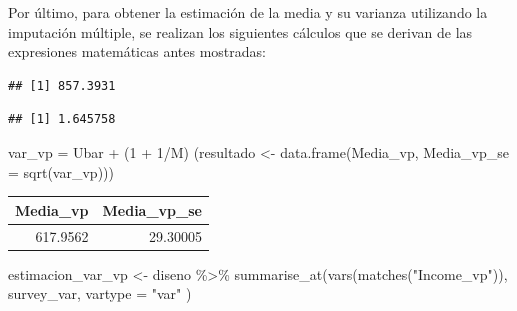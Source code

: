 \documentclass[
  12pt,
]{book}
\newenvironment{Shaded}{\begin{snugshade}}{\end{snugshade}}
\newcommand{\AttributeTok}[1]{\textcolor[rgb]{0.77,0.63,0.00}{#1}}
\newcommand{\DecValTok}[1]{\textcolor[rgb]{0.00,0.00,0.81}{#1}}
\newcommand{\FunctionTok}[1]{\textcolor[rgb]{0.00,0.00,0.00}{#1}}
\newcommand{\NormalTok}[1]{#1}
\newcommand{\OtherTok}[1]{\textcolor[rgb]{0.56,0.35,0.01}{#1}}
\newcommand{\SpecialCharTok}[1]{\textcolor[rgb]{0.00,0.00,0.00}{#1}}
\newcommand{\StringTok}[1]{\textcolor[rgb]{0.31,0.60,0.02}{#1}}
\begin{document}
Por último, para obtener la estimación de la media y su varianza utilizando la imputación múltiple, se realizan los siguientes cálculos que se derivan de las expresiones matemáticas antes mostradas:

\begin{Shaded}
\end{Shaded}

\begin{verbatim}
## [1] 857.3931
\end{verbatim}

\begin{Shaded}
\end{Shaded}

\begin{verbatim}
## [1] 1.645758
\end{verbatim}

\begin{Shaded}
\begin{Highlighting}[]
\NormalTok{var\_vp }\OtherTok{=}\NormalTok{ Ubar }\SpecialCharTok{+}\NormalTok{ (}\DecValTok{1} \SpecialCharTok{+} \DecValTok{1}\SpecialCharTok{/}\NormalTok{M) }
\NormalTok{(resultado }\OtherTok{\textless{}{-}} \FunctionTok{data.frame}\NormalTok{(Media\_vp, }
                        \AttributeTok{Media\_vp\_se =} \FunctionTok{sqrt}\NormalTok{(var\_vp)))}
\end{Highlighting}
\end{Shaded}

\begin{tabular}{r|r}
\hline
Media\_vp & Media\_vp\_se\\
\hline
617.9562 & 29.30005\\
\hline
\end{tabular}

\begin{Shaded}
\begin{Highlighting}[]
\NormalTok{estimacion\_var\_vp }\OtherTok{\textless{}{-}}\NormalTok{  diseno }\SpecialCharTok{\%\textgreater{}\%} 
  \FunctionTok{summarise\_at}\NormalTok{(}\FunctionTok{vars}\NormalTok{(}\FunctionTok{matches}\NormalTok{(}\StringTok{"Income\_vp"}\NormalTok{)), }
\NormalTok{               survey\_var,  }\AttributeTok{vartype =} \StringTok{"var"}\NormalTok{ )}
\end{Highlighting}
\end{Shaded}
\end{document}
